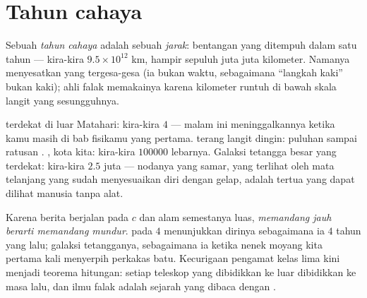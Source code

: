 \section{Tahun cahaya}

\begin{definition}\label{def:g8:speed-of-light:lightyear}
Sebuah \emph{tahun cahaya} adalah sebuah
\emph{jarak}: bentangan yang ditempuh  dalam satu tahun ---
kira-kira $9.5 \times
10^{12}$ km, hampir sepuluh juta juta kilometer. Namanya menyesatkan
yang tergesa-gesa (ia bukan waktu, sebagaimana ``langkah kaki'' bukan
kaki); ahli falak memakainya karena kilometer runtuh di bawah skala
langit yang sesungguhnya.
\end{definition}

\begin{example}\label{ex:g8:speed-of-light:ladder}
 terdekat di luar Matahari: kira-kira $4$  ---
 malam ini meninggalkannya ketika kamu masih di bab fisikamu
yang pertama.  terang langit  dingin: puluhan sampai
ratusan . , kota  kita: kira-kira
$100000$  lebarnya. Galaksi tetangga besar yang terdekat:
kira-kira $2.5$ juta  --- nodanya yang samar, yang
terlihat oleh mata telanjang yang sudah menyesuaikan diri dengan
gelap, adalah  tertua yang dapat dilihat manusia tanpa alat.
\end{example}

\begin{proposition}\label{prop:g8:speed-of-light:timemachine}
Karena berita  berjalan pada $c$ dan alam semestanya luas,
\emph{memandang jauh berarti memandang mundur}.  pada $4$
 menunjukkan dirinya sebagaimana ia $4$ tahun yang lalu;
galaksi tetangganya, sebagaimana ia ketika nenek moyang kita pertama
kali menyerpih perkakas batu. Kecurigaan pengamat  kelas lima
kini menjadi teorema hitungan: setiap teleskop yang dibidikkan ke luar
dibidikkan ke masa lalu, dan ilmu falak adalah sejarah yang dibaca
dengan  .
\end{proposition}


